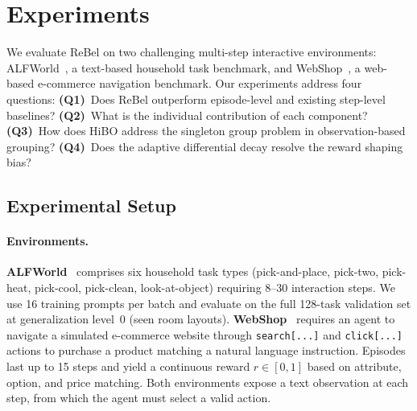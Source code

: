 
\section{Experiments}
\label{sec:experiments}

We evaluate ReBel on two challenging multi-step interactive environments:
ALFWorld~\citep{shridhar2021alfworld}, a text-based household task benchmark,
and WebShop~\citep{yao2022webshop}, a web-based e-commerce navigation benchmark.
Our experiments address four questions:
\textbf{(Q1)}~Does ReBel outperform episode-level and existing step-level baselines?
\textbf{(Q2)}~What is the individual contribution of each component?
\textbf{(Q3)}~How does HiBO address the singleton group problem in observation-based grouping?
\textbf{(Q4)}~Does the adaptive differential decay resolve the reward shaping bias?


\subsection{Experimental Setup}
\label{sec:exp_setup}

\paragraph{Environments.}
\textbf{ALFWorld}~\citep{shridhar2021alfworld} comprises six household task types
(pick-and-place, pick-two, pick-heat, pick-cool, pick-clean, look-at-object)
requiring 8--30 interaction steps.
We use 16 training prompts per batch and evaluate on the full 128-task validation set
at generalization level~0 (seen room layouts).
\textbf{WebShop}~\citep{yao2022webshop} requires an agent to navigate a simulated
e-commerce website through \texttt{search[...]} and \texttt{click[...]} actions to
purchase a product matching a natural language instruction.
Episodes last up to 15 steps and yield a continuous reward $r \in [0,1]$ based on
attribute, option, and price matching.
Both environments expose a text observation at each step, from which the agent must
select a valid action.

